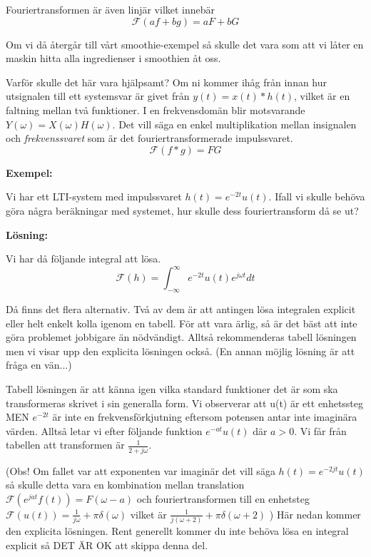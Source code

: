 \documentclass{article}
\begin{document}
Fouriertransformen är även linjär vilket innebär
\begin{displaymath}
  \mathcal{F}(a f + b g) = a F + b G
\end{displaymath}

Om vi då återgår till vårt smoothie-exempel så skulle det vara som att vi låter
en maskin hitta alla ingredienser i smoothien åt oss.

Varför skulle det här vara hjälpsamt? Om ni kommer ihåg från innan hur
utsignalen till ett systemsvar är givet från $y(t) = x(t) * h(t)$,
vilket är en faltning mellan två funktioner.
I en frekvensdomän blir motsvarande $Y(\omega) = X(\omega) H(\omega)$.
Det vill säga en enkel multiplikation mellan insignalen och
\emph{frekvenssvaret} som är det fouriertransformerade impulssvaret.
\begin{displaymath}
  \mathcal{F}(f*g) = F G
\end{displaymath}

\textbf{Exempel:}

Vi har ett LTI-system med impulssvaret $h(t) = e^{-2 t} u(t)$. Ifall vi skulle behöva göra några beräkningar med systemet, hur skulle dess fouriertransform då se ut?

\textbf{Lösning:}

Vi har då följande integral att lösa. 
\begin{displaymath} 
  \mathcal{F}(h) = \int_{-\infty}^{\infty} e^{-2 t} u(t) e^{j \omega t} dt
\end{displaymath}

Då finns det flera alternativ. Två av dem är att antingen lösa integralen explicit eller helt enkelt kolla igenom en tabell. För att vara ärlig, så är det bäst att inte göra problemet jobbigare än nödvändigt. Alltså rekommenderas tabell lösningen men vi visar upp den explicita lösningen också. (En annan möjlig lösning är att fråga en vän...)

Tabell lösningen är att känna igen vilka standard funktioner det är som ska transformeras skrivet i sin generalla form. Vi observerar att u(t) är ett enhetssteg MEN $e^{-2t}$ är inte en frekvensförkjutning eftersom potensen antar inte imaginära värden. Alltså letar vi efter följande funktion $e^{-a t} u(t)$ där $a>0$. Vi får från tabellen att transformen är $\frac{1}{2+j\omega}$.

(Obs! Om fallet var att exponenten var imaginär det vill säga 
$h(t)= e^{-2 j t} u(t)$
så skulle detta vara en kombination mellan translation
$\mathcal{F}(e^{j a t} f(t)) = F(\omega - a)$
och fouriertransformen till en enhetsteg 
$\mathcal{F}(u(t)) = \frac{1}{j\omega} + \pi \delta (\omega) $
vilket är
$\frac{1}{j(\omega+2)} + \pi \delta (\omega+2)$
)
Här nedan kommer den explicita lösningen. Rent generellt kommer du inte behöva lösa en integral explicit så DET ÄR OK att skippa denna del.
\end{document}
